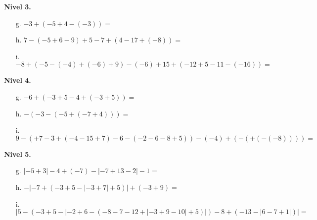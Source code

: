 \documentclass[spanish,letterpaper, 11pt, addpoints, answers]{exam}
\begin{document}
\begin{questions}
\newpage
\textbf{Nivel 3.}\\
\begin{itemize}
\item[g.] $-3+(-5+4-(-3))=$
\vspace{6cm}
\item[h.] $7-(-5+6-9)+5-7+(4-17+(-8))=$
\vspace{6cm}
\item[i.] $-8+(-5-(-4)+(-6)+9)-(-6)+15+(-12+5-11-(-16))=$ 
\vspace{6cm}
\end{itemize}

\newpage
\textbf{Nivel 4.}\\
\begin{itemize}
\item[g.] $-6+(-3+5-4+(-3+5))=$
\vspace{6cm}
\item[h.] $-(-3-(-5+(-7+4)))=$
\vspace{6cm}
\item[i.] $9-(+7-3+(-4-15+7)-6-(-2-6-8+5))-(-4)+(-(+(-(-8))))=$ 
\vspace{6cm}
\end{itemize}

\newpage
\textbf{Nivel 5.}\\
\begin{itemize}
\item[g.] $|-5+3|-4+(-7)-|-7+13-2|-1=$
\vspace{6cm}
\item[h.] $-|-7+(-3+5-|-3+7|+5)|+(-3+9)=$
\vspace{6cm}
\item[i.] $|5-(-3+5-|-2+6-(-8-7-12+|-3+9-10|+5)|)-8+(-13-|6-7+1|)|=$ 
\vspace{6cm}
\end{itemize}

\end{questions}
\end{document}

